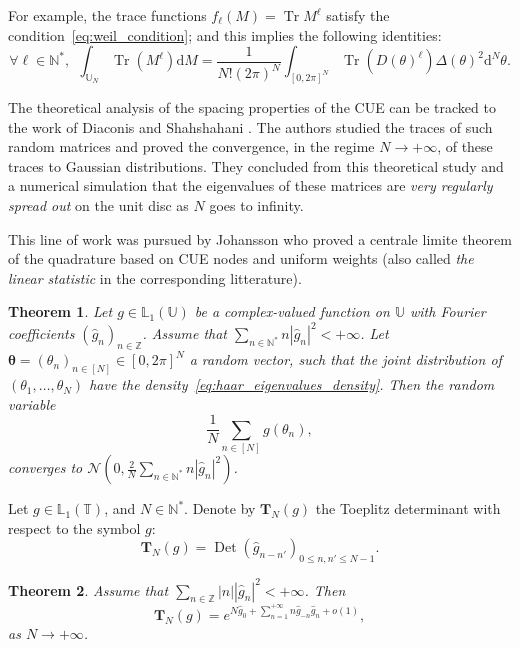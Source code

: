 \documentclass[twoside,11pt]{book}
\newtheorem{theorem}{Theorem}
\DeclareMathOperator{\Tr}{Tr}
\DeclareMathOperator{\Det}{Det}
\begin{document}
For example, the trace functions $f_{\ell}(M) = \Tr M^{\ell}$ satisfy the condition~\eqref{eq:weil_condition}; and this implies the following identities:
\begin{equation}
\forall \ell \in \mathbb{N}^{*},\: \: \int_{\mathbb{U}_{N}}\Tr(M^{\ell}) \mathrm{d}M = \frac{1}{N!(2 \pi)^{N}} \int_{[0,2\pi]^{N}} \Tr(D(\theta)^{\ell}) \Delta(\theta)^{2} \mathrm{d}^{N}\theta.
\end{equation}

The theoretical analysis of the spacing properties of the CUE can be tracked to the work of Diaconis and Shahshahani \citep{DiSh94}.
  The authors studied the traces of such random matrices and proved the convergence, in the regime $N \rightarrow +\infty$, of these traces to Gaussian distributions. They concluded from this theoretical study and a numerical simulation that the eigenvalues of these matrices are  \emph{very regularly spread out} on the unit disc as $N$ goes to infinity.





This line of work was pursued by Johansson who proved a centrale limite theorem of the
quadrature based on CUE nodes and uniform weights (also called \emph{the linear statistic} in the corresponding litterature).


\begin{theorem}
Let $g \in \mathbb{L}_{1}(\mathbb{U})$ be a complex-valued function on $\mathbb{U}$ with Fourier coefficients $(\hat{g}_{n})_{n \in \mathbb{Z}}$. Assume that $\displaystyle \sum\limits_{n \in \mathbb{N}^{*}} n|\hat{g}_{n}|^{2} <+\infty$. Let $\bm{\theta} = (\theta_{n})_{n \in [N]} \in [0,2\pi]^{N}$ a random vector, such that the joint distribution of $(\theta_{1}, \dots, \theta_{N})$ have the density~\eqref{eq:haar_eigenvalues_density}. Then the random variable
\begin{equation}
\frac{1}{N}\sum\limits_{n \in [N]} g(\theta_{n}), 
\end{equation}
converges to $\displaystyle \mathcal{N}(0,\frac{2}{N}\sum\limits_{n \in \mathbb{N}^{*}} n|\hat{g}_{n}|^{2})$.
\end{theorem}


Let $g \in \mathbb{L}_{1}(\mathbb{T})$, and $N \in \mathbb{N}^{*}$. Denote by $\bm{T}_{N}(g)$ the Toeplitz determinant with respect to the symbol $g$:
\begin{equation}
\bm{T}_{N}(g) = \Det(\hat{g}_{n-n'})_{0 \leq n,n' \leq N-1}.
\end{equation}
\begin{theorem}
 Assume that $\displaystyle \sum\limits_{n \in \mathbb{Z}} |n||\hat{g}_{n}|^{2} < +\infty$. Then
\begin{equation}
\bm{T}_{N}(g) = e^{N\hat{g}_{0} + \sum\limits_{n  =1}^{+\infty}n \hat{g}_{-n} \hat{g}_{n} + o(1)},
\end{equation}
as $N \rightarrow +\infty$.
\end{theorem}
\end{document}
